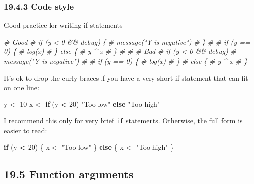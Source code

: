 \documentclass[
]{article}
\newenvironment{Shaded}{\begin{snugshade}}{\end{snugshade}}
\newcommand{\CommentTok}[1]{\textcolor[rgb]{0.56,0.35,0.01}{\textit{#1}}}
\newcommand{\ControlFlowTok}[1]{\textcolor[rgb]{0.13,0.29,0.53}{\textbf{#1}}}
\newcommand{\DecValTok}[1]{\textcolor[rgb]{0.00,0.00,0.81}{#1}}
\newcommand{\NormalTok}[1]{#1}
\newcommand{\OtherTok}[1]{\textcolor[rgb]{0.56,0.35,0.01}{#1}}
\newcommand{\SpecialCharTok}[1]{\textcolor[rgb]{0.81,0.36,0.00}{\textbf{#1}}}
\newcommand{\StringTok}[1]{\textcolor[rgb]{0.31,0.60,0.02}{#1}}
\begin{document}
\hypertarget{code-style}{%
\subsubsection{19.4.3 Code style}\label{code-style}}

Good practice for writing if statements

\begin{Shaded}
\begin{Highlighting}[]
\CommentTok{\# Good}
\CommentTok{\# if (y \textless{} 0 \&\& debug) \{}
\CommentTok{\#   message("Y is negative")}
\CommentTok{\# \}}
\CommentTok{\# }
\CommentTok{\# if (y == 0) \{}
\CommentTok{\#   log(x)}
\CommentTok{\# \} else \{}
\CommentTok{\#   y \^{} x}
\CommentTok{\# \}}
\CommentTok{\# }
\CommentTok{\# \# Bad}
\CommentTok{\# if (y \textless{} 0 \&\& debug)}
\CommentTok{\# message("Y is negative")}
\CommentTok{\# }
\CommentTok{\# if (y == 0) \{}
\CommentTok{\#   log(x)}
\CommentTok{\# \} }
\CommentTok{\# else \{}
\CommentTok{\#   y \^{} x}
\CommentTok{\# \}}
\end{Highlighting}
\end{Shaded}

It's ok to drop the curly braces if you have a very short if statement
that can fit on one line:

\begin{Shaded}
\begin{Highlighting}[]
\NormalTok{y }\OtherTok{\textless{}{-}} \DecValTok{10}
\NormalTok{x }\OtherTok{\textless{}{-}} \ControlFlowTok{if}\NormalTok{ (y }\SpecialCharTok{\textless{}} \DecValTok{20}\NormalTok{) }\StringTok{"Too low"} \ControlFlowTok{else} \StringTok{"Too high"}
\end{Highlighting}
\end{Shaded}

I recommend this only for very brief \texttt{if} statements. Otherwise,
the full form is easier to read:

\begin{Shaded}
\begin{Highlighting}[]
\ControlFlowTok{if}\NormalTok{ (y }\SpecialCharTok{\textless{}} \DecValTok{20}\NormalTok{) \{}
\NormalTok{  x }\OtherTok{\textless{}{-}} \StringTok{"Too low"} 
\NormalTok{\} }\ControlFlowTok{else}\NormalTok{ \{}
\NormalTok{  x }\OtherTok{\textless{}{-}} \StringTok{"Too high"}
\NormalTok{\}}
\end{Highlighting}
\end{Shaded}

\hypertarget{function-arguments}{%
\subsection{19.5 Function arguments}\label{function-arguments}}
\end{document}
